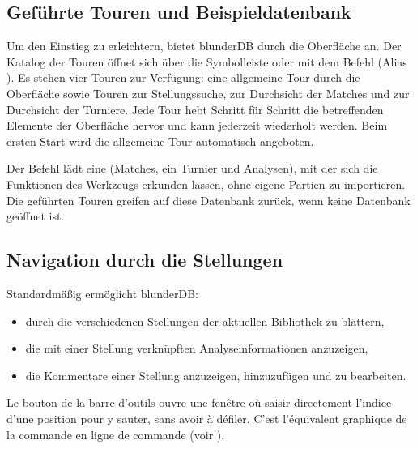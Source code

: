 \documentclass[letterpaper,10pt,german]{sphinxmanual}
\begin{document}
\subsection{Geführte Touren und Beispieldatenbank}
\label{\detokenize{manuel:visites-guidees-et-base-d-exemple}}\label{\detokenize{manuel:visites-guidees}}
\sphinxAtStartPar
Um den Einstieg zu erleichtern, bietet blunderDB  durch die Oberfläche an. Der Katalog der Touren öffnet sich über die Symbolleiste oder mit dem Befehl  (Alias ). Es stehen vier Touren zur Verfügung: eine allgemeine Tour durch die Oberfläche sowie Touren zur Stellungssuche, zur Durchsicht der Matches und zur Durchsicht der Turniere. Jede Tour hebt Schritt für Schritt die betreffenden Elemente der Oberfläche hervor und kann jederzeit wiederholt werden. Beim ersten Start wird die allgemeine Tour automatisch angeboten.

\sphinxAtStartPar
Der Befehl  lädt eine  (Matches, ein Turnier und Analysen), mit der sich die Funktionen des Werkzeugs erkunden lassen, ohne eigene Partien zu importieren. Die geführten Touren greifen auf diese Datenbank zurück, wenn keine Datenbank geöffnet ist.


\subsection{Navigation durch die Stellungen}
\label{\detokenize{manuel:navigation-dans-les-positions}}\label{\detokenize{manuel:navigation-positions}}
\sphinxAtStartPar
Standardmäßig ermöglicht blunderDB:
\begin{itemize}
\item {} 
\sphinxAtStartPar
durch die verschiedenen Stellungen der aktuellen Bibliothek zu blättern,

\item {} 
\sphinxAtStartPar
die mit einer Stellung verknüpften Analyseinformationen anzuzeigen,

\item {} 
\sphinxAtStartPar
die Kommentare einer Stellung anzuzeigen, hinzuzufügen und zu bearbeiten.

\end{itemize}

\sphinxAtStartPar
Le bouton  de la barre d’outils ouvre une fenêtre où
saisir directement l’indice d’une position pour y sauter, sans avoir à
défiler. C’est l’équivalent graphique de la commande \sphinxcode{\sphinxupquote{{[}number{]}}} en ligne de
commande (voir {\hyperref[\detokenize{cmd_mode:cmd-positions}]{}}).
\end{document}
